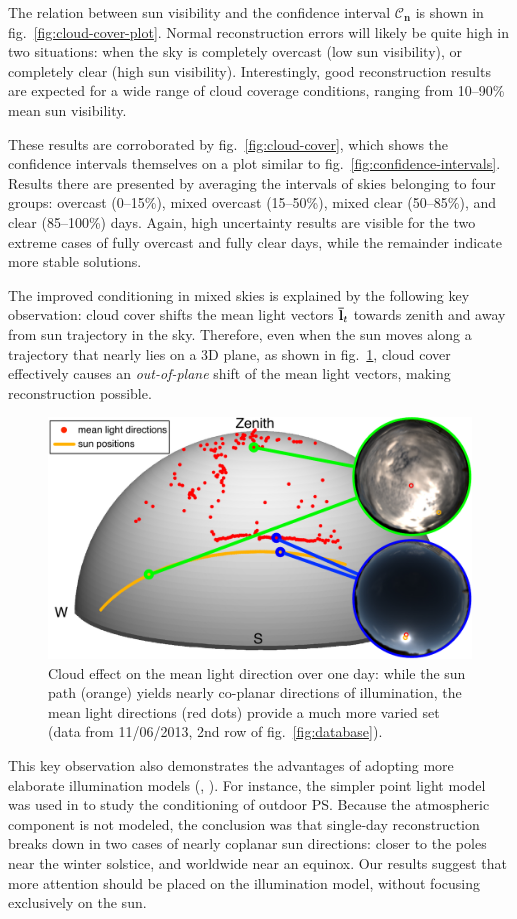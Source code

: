 The relation between sun visibility and the confidence interval $\mathcal{C}_\mathbf{n}$ is shown in fig.~\ref{fig:cloud-cover-plot}. Normal reconstruction errors will likely be quite high in two situations: when the sky is completely overcast (low sun visibility), or completely clear (high sun visibility). Interestingly, good reconstruction results are expected for a wide range of cloud coverage conditions, ranging from 10--90\% mean sun visibility.

These results are corroborated by fig.~\ref{fig:cloud-cover}, which shows the confidence intervals themselves on a plot similar to fig.~\ref{fig:confidence-intervals}. Results there are presented by averaging the intervals of skies belonging to four groups: overcast (0--15\%), mixed overcast (15--50\%), mixed clear (50--85\%), and clear (85--100\%) days. Again, high uncertainty results are visible for the two extreme cases of fully overcast and fully clear days, while the remainder indicate more stable solutions.

The improved conditioning in mixed skies is explained by the following key observation: cloud cover shifts the mean light vectors ${\bf \bar l}_t$ towards zenith and away from sun trajectory in the sky. Therefore, even when the sun moves along a trajectory that nearly lies on a 3D plane, as shown in fig.~\ref{fig:mlv}, cloud cover effectively causes an {\em out-of-plane} shift of the mean light vectors, making reconstruction possible.

\begin{figure}
    \centering
    \includegraphics[width=0.5\linewidth]{./figures/mlvFig/mlvFig.pdf}
    \caption[Cloud effect on mean light direction]{Cloud effect on the mean light direction over one day: while the sun path (orange) yields nearly co-planar directions of illumination, the mean light directions (red dots) provide a much more varied set (data from 11/06/2013, 2nd row of fig.~\ref{fig:database}).}
    \label{fig:mlv}
\end{figure}

This key observation also demonstrates the advantages of adopting more elaborate illumination models (\eg, \cite{yu-iccp-13}). For instance, the simpler point light model was used in \cite{shen-pg-14} to study the conditioning of outdoor PS. Because the atmospheric component is not modeled, the conclusion was that single-day reconstruction breaks down in two cases of nearly coplanar sun directions: closer to the poles near the winter solstice, and worldwide near an equinox. Our results suggest that more attention should be placed on the illumination model, without focusing exclusively on the sun.

